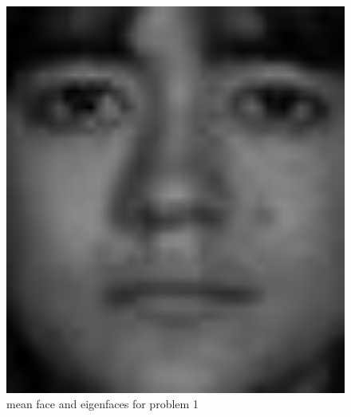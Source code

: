\documentclass[english,onecolumn]{IEEEtran}
\begin{document}
\begin{enumerate}
\begin{figure}[htbp]
{\begin{minipage}[t]{0.2\linewidth}
            \includegraphics[width=1\textwidth]{figures/p4/problem1/meanface.jpg}
            \end{minipage}
        }
        \caption{mean face and eigenfaces for problem 1}
        \label{fig.p4_1}
    \end{figure} 


\end{enumerate}
\end{document}
